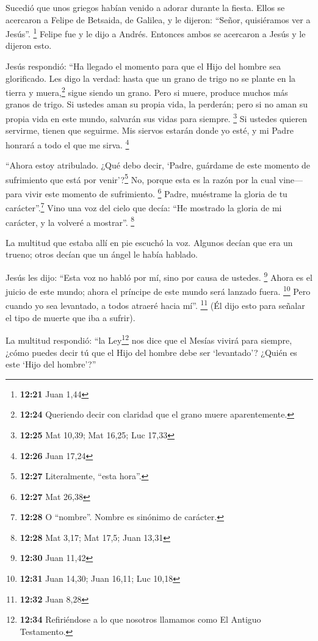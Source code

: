  Sucedió que unos griegos habían venido a adorar durante
la fiesta.  Ellos se acercaron a Felipe de Betsaida, de
Galilea, y le dijeron: ``Señor, quisiéramos ver a Jesús''. \footnote{\textbf{12:21}
  Juan 1,44}  Felipe fue y le dijo a Andrés. Entonces
ambos se acercaron a Jesús y le dijeron esto.

 Jesús respondió: ``Ha llegado el momento para que el
Hijo del hombre sea glorificado.  Les digo la verdad:
hasta que un grano de trigo no se plante en la tierra y
muera,\footnote{\textbf{12:24} Queriendo decir con claridad que el grano
  muere aparentemente.} sigue siendo un grano. Pero si muere, produce
muchos más granos de trigo.  Si ustedes aman su propia
vida, la perderán; pero si no aman su propia vida en este mundo,
salvarán sus vidas para siempre. \footnote{\textbf{12:25} Mat 10,39; Mat
  16,25; Luc 17,33}  Si ustedes quieren servirme, tienen
que seguirme. Mis siervos estarán donde yo esté, y mi Padre honrará a
todo el que me sirva. \footnote{\textbf{12:26} Juan 17,24}

 ``Ahora estoy atribulado. ¿Qué debo decir, `Padre,
guárdame de este momento de sufrimiento que está por venir'?\footnote{\textbf{12:27}
  Literalmente, ``esta hora''.} No, porque esta es la razón por la cual
vine---para vivir este momento de sufrimiento. \footnote{\textbf{12:27}
  Mat 26,38}  Padre, muéstrame la gloria de tu
carácter''.\footnote{\textbf{12:28} O ``nombre''. Nombre es sinónimo de
  carácter.} Vino una voz del cielo que decía: ``He mostrado la gloria
de mi carácter, y la volveré a mostrar''. \footnote{\textbf{12:28} Mat
  3,17; Mat 17,5; Juan 13,31}

 La multitud que estaba allí en pie escuchó la voz.
Algunos decían que era un trueno; otros decían que un ángel le había
hablado.

 Jesús les dijo: ``Esta voz no habló por mí, sino por
causa de ustedes. \footnote{\textbf{12:30} Juan 11,42} 
Ahora es el juicio de este mundo; ahora el príncipe de este mundo será
lanzado fuera. \footnote{\textbf{12:31} Juan 14,30; Juan 16,11; Luc
  10,18}  Pero cuando yo sea levantado, a todos atraeré
hacia mí''. \footnote{\textbf{12:32} Juan 8,28}  (Él dijo
esto para señalar el tipo de muerte que iba a sufrir).

 La multitud respondió: ``la Ley\footnote{\textbf{12:34}
  Refiriéndose a lo que nosotros llamamos como El Antiguo Testamento.}
nos dice que el Mesías vivirá para siempre, ¿cómo puedes decir tú que el
Hijo del hombre debe ser `levantado'? ¿Quién es este `Hijo del
hombre'?''

